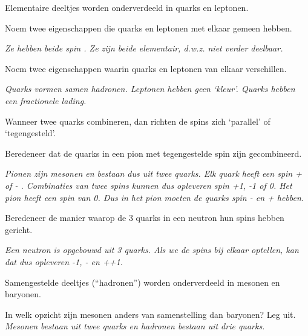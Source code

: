 \begin{opdrachten}
\item Elementaire deeltjes worden onderverdeeld in quarks en leptonen. 
    \begin{opdrachten} 
    \item Noem twee eigenschappen die quarks en leptonen met elkaar gemeen hebben.

    \textit{Ze hebben beide spin \textonehalf. Ze zijn beide elementair,
    d.w.z. niet verder deelbaar.}
    
    \item Noem twee eigenschappen waarin quarks en leptonen van elkaar verschillen.
   
    \textit{Quarks vormen samen hadronen. Leptonen hebben geen `kleur'.
    Quarks hebben een fractionele lading.}

    \end{opdrachten} 

\item Wanneer twee quarks combineren, dan richten de spins zich
`parallel' of `tegengesteld'.

    \begin{opdrachten} 
    \item Beredeneer dat de quarks in een pion met tegengestelde spin zijn gecombineerd.

    \textit{Pionen zijn mesonen en bestaan dus uit twee quarks. Elk
    quark heeft een spin + of - \textonehalf. Combinaties van twee spins
    kunnen dus opleveren spin +1, -1 of 0. Het pion heeft een spin van
    0. Dus in het pion moeten de quarks spin -\textonehalf \xspace en
    +\textonehalf \xspace hebben.}

    \item Beredeneer de manier waarop de 3 quarks in een neutron hun
    spins hebben gericht.
    
    \textit{Een neutron is opgebouwd uit 3 quarks. Als we de spins bij
    elkaar optellen, kan dat dus opleveren -1\textonehalf,
    -\textonehalf\xspace en +\textonehalf \xspace  +1\textonehalf.}
    \end{opdrachten} 

\item Samengestelde deeltjes (``hadronen'') worden onderverdeeld in mesonen en baryonen.
    
    \begin{opdrachten} 
    \item  In welk opzicht zijn mesonen anders van
    samenstelling dan baryonen? Leg uit.     
    \textit{Mesonen bestaan uit twee quarks en hadronen bestaan uit drie
    quarks.} 
    

\end{opdrachten}
\end{opdrachten}
